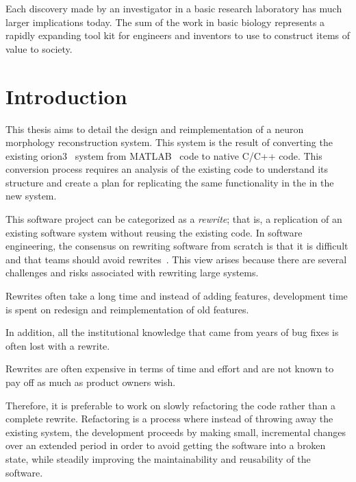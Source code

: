 \begin{savequote}[0.55\linewidth]
	\begin{fancyquote}
		Each discovery made by an investigator in a basic research
		laboratory has much larger implications today. The sum of the work in basic
		biology represents a rapidly expanding tool kit for engineers and inventors to
		use to construct items of value to society.
	\end{fancyquote}
\end{savequote}
\chapter{Introduction}\label{ch:introduction}


This thesis aims to detail the design and reimplementation of a
neuron morphology reconstruction system. This system is the result of
converting the existing \gls{orion3}~\autocite{ORION_Santamaria-Pang2015} system from
MATLAB~\autocite{MATLAB:2013a} code to native C/C++ code.
This conversion process requires an analysis of the existing code
to understand its structure and create a plan for replicating the
same functionality in the in the new system.

This software project can be categorized as a \emph{rewrite}; that
is, a replication of an existing software system without
reusing the existing code. In software engineering, the consensus
on rewriting software from scratch is that it is difficult and
that teams should avoid rewrites~\autocite{Software-rewrites:Spolsky:2000}. This view
arises because there are several challenges and risks associated
with rewriting large systems.
\begin{itemize*}[label={}]
\item Rewrites often take a long time and instead of adding
	features, development time is spent on redesign and
	reimplementation of old features.
\item In addition, all the institutional knowledge that came from
	years of bug fixes is often lost with a rewrite.
\item Rewrites are often expensive in terms of time and effort and
	are not known to pay off as much as product owners wish.
\end{itemize*}
Therefore, it is preferable to work on slowly refactoring the code
rather than a complete rewrite. Refactoring is a process where
instead of throwing away the existing system, the development
proceeds by making small, incremental changes over an extended
period in order to avoid getting the software into a broken state,
while steadily improving the maintainability and reusability of the
software.

